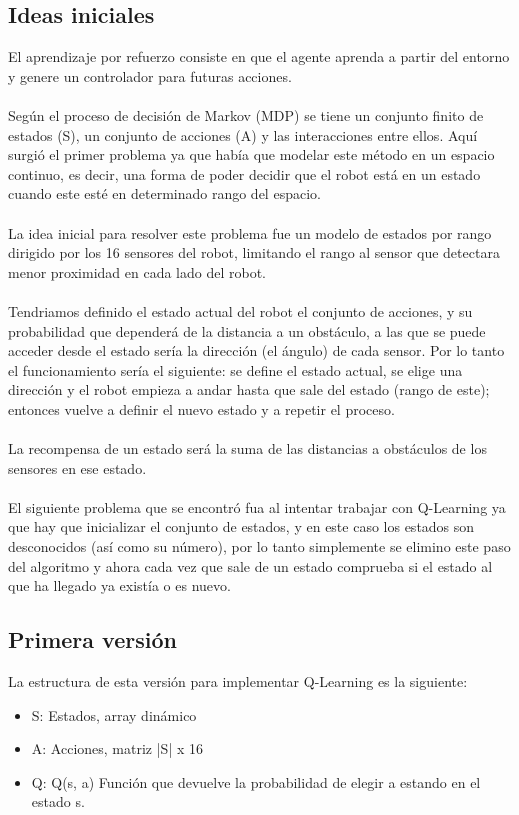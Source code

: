 \documentclass[14pt]{extarticle}
\theoremstyle{definition}
\theoremstyle{remark}
\begin{document}
\subsection{Ideas iniciales}\label{subsec:ideasiniciales}
El aprendizaje por refuerzo consiste en que el agente aprenda a partir del entorno y genere un controlador para futuras acciones.\\\\
Según el proceso de decisión de Markov (MDP) se tiene un conjunto finito de estados (S), un conjunto de acciones (A) y las interacciones entre ellos. Aquí surgió el primer problema ya que había que modelar este método en un espacio continuo, es decir, una forma de poder decidir que el robot está en un estado cuando este esté en determinado rango del espacio. \\\\
La idea inicial para resolver este problema fue un modelo de estados por rango dirigido por los 16 sensores del robot, limitando el rango al sensor que detectara menor proximidad en cada lado del robot.\\\\
Tendriamos definido el estado actual del robot el conjunto de acciones, y su probabilidad que dependerá de la distancia a un obstáculo, a las que se puede acceder desde el estado sería la dirección (el ángulo) de cada sensor. Por lo tanto el funcionamiento sería el siguiente: se define el estado actual, se elige una dirección y el robot empieza a andar hasta que sale del estado (rango de este); entonces vuelve a definir el nuevo estado y a repetir el proceso.\\\\
La recompensa de un estado será la suma de las distancias a obstáculos de los sensores en ese estado.\\\\
El siguiente problema que se encontró fua al intentar trabajar con Q-Learning ya que hay que inicializar el conjunto de estados, y en este caso los estados son desconocidos (así como su número), por lo tanto simplemente se elimino este paso del algoritmo y ahora cada vez que sale de un estado comprueba si el estado al que ha llegado ya existía o es nuevo.
\subsection{Primera versión}\label{subsec:primeraversion}
La estructura de esta versión para implementar Q-Learning es la siguiente:
\begin{itemize}
	\item S: Estados, array dinámico
	\item A: Acciones, matriz |S| x 16
	\item Q: Q(s, a) Función que devuelve la probabilidad de elegir a estando en el estado s.
\end{itemize}
\end{document}
